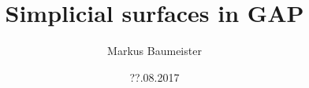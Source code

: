 \documentclass[11pt, handout]{beamer}
\author{Markus Baumeister}
\title{Simplicial surfaces in GAP}
\date{??.08.2017}
\begin{document}
\begin{frame}
\titlepage
\end{frame}


\begin{frame}
    \tableofcontents
\end{frame}



            



\end{document}
